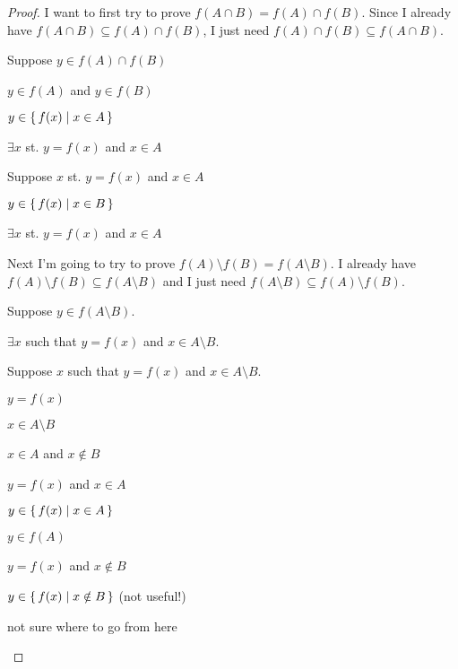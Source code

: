 \documentclass[../../main.tex]{subfiles}
\begin{document}
\begin{q}
    \begin{ans}
    
    \end{ans}
    \begin{proof}
        I want to first try to prove $f(A \cap B) = f(A) \cap f(B)$. Since I already have $f(A \cap B) \subseteq f(A) \cap f(B)$, I just need $f(A) \cap f(B) \subseteq f(A \cap B)$.
        
        \begin{linebyline}
            \item Suppose $y \in f(A) \cap f(B)$
            \item $y \in f(A)$ and $y \in f(B)$
            \item $y \in \{\,f(x)\mid x \in A\,\}$
            \item $\exists x$ st. $y = f(x)$ and $x \in A$
            \item Suppose $x$ st. $y = f(x)$ and $x \in A$
            \item $y \in \{\,f(x)\mid x \in B\,\}$
            \item $\exists x$ st. $y = f(x)$ and $x \in A$
        \end{linebyline}

        Next I'm going to try to prove $f(A) \setminus f(B) = f(A \setminus B)$. I already have $f(A) \setminus f(B) \subseteq f(A \setminus B)$ and I just need $f(A \setminus B) \subseteq f(A) \setminus f(B)$.
        \begin{linebyline}
            \item Suppose $y \in f(A \setminus B)$.
            \item $\exists x$ such that $y=f(x)$ and $x \in A \setminus B$.
            \item Suppose $x$ such that $y=f(x)$ and $x \in A \setminus B$.
            \begin{linebyline}
                \item $y=f(x)$
                \item $x \in A \setminus B$
                \item $x \in A$ and $x \notin B$
                \item $y=f(x)$ and $x \in A$
                \item $y \in \{\,f(x)\mid x \in A\,\}$
                \item $y \in f(A)$
                \item $y=f(x)$ and $x \notin B$
                \item \sout{$y \in \{\,f(x)\mid x \notin B\,\}$} (not useful!)
            \end{linebyline}
        \end{linebyline}
        \begin{xx}
            not sure where to go from here
        \end{xx}
    \end{proof}
\end{q}
\end{document}
